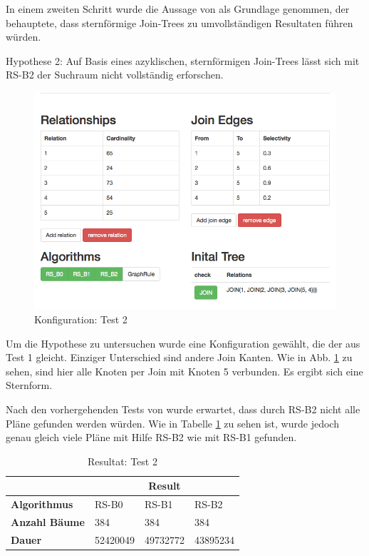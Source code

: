 In einem zweiten Schritt wurde die Aussage von \cite{shanbhag2014optimizing} als Grundlage genommen, der behauptete, dass sternförmige Join-Trees zu umvollständigen Resultaten führen würden.

Hypothese 2: Auf Basis eines azyklischen, sternförmigen Join-Trees lässt sich mit RS-B2 der Suchraum nicht vollständig erforschen.

\begin{figure}[ht]
  \centering
  \includegraphics[width=\textwidth]{05_ResultsEvaluation/00_media/Test2.png}
  \caption{Konfiguration: Test 2}
  \label{Konfiguration:Test2}
\end{figure}


Um die Hypothese zu untersuchen wurde eine Konfiguration gewählt, die der aus Test 1 gleicht. Einziger Unterschied sind andere Join Kanten. Wie in  Abb. \ref{Konfiguration:Test2} zu sehen, sind hier alle Knoten per Join mit Knoten 5 verbunden. Es ergibt sich eine Sternform.

Nach den vorhergehenden Tests von \cite{shanbhag2014optimizing} wurde erwartet, dass durch RS-B2 nicht alle Pläne gefunden werden würden. Wie in Tabelle \ref{Result:Test2} zu sehen ist, wurde jedoch genau gleich viele Pläne mit Hilfe RS-B2 wie mit RS-B1 gefunden. 

\begin{table}[h]
\centering

\begin{tabular}{|l|l|l|l|}
\hline
                         & \multicolumn{3}{c|}{{\bf Result}} \\ \hline
{\bf Algorithmus}        & RS-B0     & RS-B1     & RS-B2     \\ \hline
{\bf Anzahl Bäume}       & 384       & 384       & 384       \\ \hline
{\bf Dauer}              & 52420049  & 49732772  & 43895234  \\ \hline
\end{tabular}

\caption{Resultat: Test 2}
\label{Result:Test2}
\end{table}


